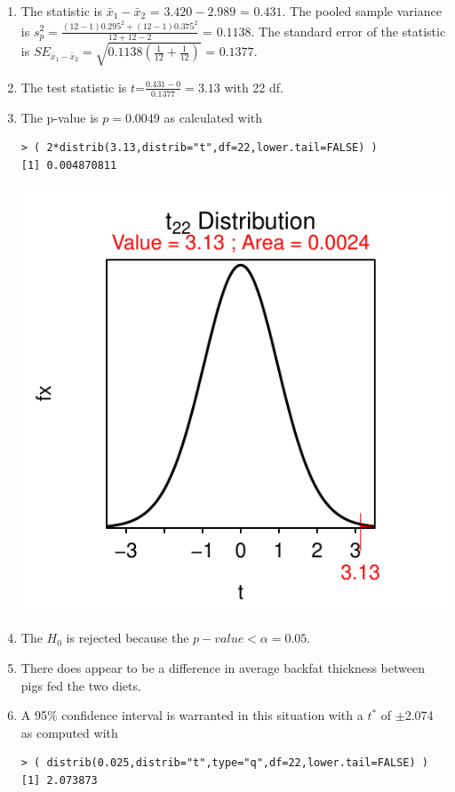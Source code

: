 \documentclass[10pt,openany]{book}\usepackage[]{graphicx}\usepackage[]{color}
\makeatletter
\newenvironment{kframe}{%
 \def\at@end@of@kframe{}%
 \ifinner\ifhmode%
  \def\at@end@of@kframe{\end{minipage}}%
  \begin{minipage}{\columnwidth}%
 \fi\fi%
 \def\FrameCommand##1{\hskip\@totalleftmargin \hskip-\fboxsep
 \colorbox{shadecolor}{##1}\hskip-\fboxsep
     \hskip-\linewidth \hskip-\@totalleftmargin \hskip\columnwidth}%
 \MakeFramed {\advance\hsize-\width
   \@totalleftmargin\z@ \linewidth\hsize
   \@setminipage}}%
 {\par\unskip\endMakeFramed%
 \at@end@of@kframe}
\newenvironment{knitrout}{}{} %
\makeatother
\begin{document}
\begin{itemize}
\begin{enumerate}
      \item The statistic is $\bar{x}_{1}-\bar{x}_{2}$ = $3.420-2.989$ = $0.431$.  The pooled sample variance is $s_{p}^{2}=\frac{(12-1)0.295^{2}+(12-1)0.375^{2}}{12+12-2}$ = $0.1138$.  The standard error of the statistic is $SE_{\bar{x}_{1}-\bar{x}_{2}}=\sqrt{0.1138\left(\frac{1}{12}+\frac{1}{12} \right)}$ = $0.1377$.
      \item The test statistic is $t$=$\frac{0.431-0}{0.1377} = 3.13$ with 22 df.
      \item The p-value is $p=0.0049$ as calculated with
\begin{knitrout}
\color{fgcolor}\begin{kframe}
\begin{verbatim}
> ( 2*distrib(3.13,distrib="t",df=22,lower.tail=FALSE) )
[1] 0.004870811
\end{verbatim}
\end{kframe}

{\centering \includegraphics[width=.4\linewidth]{Figs/unnamed-chunk-377-1} 

}



\end{knitrout}
      \item The $H_{0}$ is rejected because the $p-value <\alpha=0.05$.
      \item There does appear to be a difference in average backfat thickness between pigs fed the two diets.
      \item A 95\% confidence interval is warranted in this situation with a $t^{*}$ of $\pm$2.074 as computed with
\begin{knitrout}
\color{fgcolor}\begin{kframe}
\begin{verbatim}
> ( distrib(0.025,distrib="t",type="q",df=22,lower.tail=FALSE) )
[1] 2.073873
\end{verbatim}
\end{kframe}


\end{knitrout}
\end{enumerate}
\end{itemize}
\end{document}
